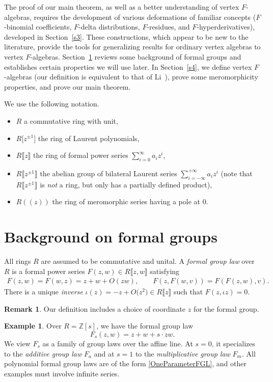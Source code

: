 \documentclass[pdftex]{sigma}
\numberwithin{equation}{section}
\theoremstyle{definition}
\newtheorem{Example}[Theorem]{Example}
\newtheorem{Remark}[Theorem]{Remark}
\def\lb{\llbracket}
\def\rb{\rrbracket}
\begin{document}
The proof of our main theorem, as well as a better understanding of vertex $F$-algebras, requires the development of various deformations of familiar concepts ($F$-binomial coefficients, $F$-delta distributions, $F$-residues, and $F$-hyperderivatives), developed in Section~\ref{s3}. These constructions, which appear to be new to the literature, provide the tools for generalizing results for ordinary vertex algebras to vertex $F$-algebras. Section~\ref{s2} reviews some background of formal groups and establishes certain properties we will use later. In Section~\ref{s4}, we define vertex $F$-algebras (our definition is equivalent to that of Li~\cite{Li}), prove some meromorphicity properties, and prove our main theorem.

We use the following notation.
\begin{itemize}\itemsep=0pt
\item
$R$ a commutative ring with unit,
\item
$R\big[z^{\pm1}\big]$ the ring of Laurent polynomials,
\item
$R\lb z\rb$ the ring of formal power series $\sum_{i=0}^\infty a_i z^i$,
\item
$R\big\lb z^{\pm1}\big\rb$ the abelian group of bilateral Laurent series $\sum_{i=-\infty}^{+\infty} a_i z^i$ (note that $R\big\lb z^{\pm1}\big\rb$ is \emph{not} a ring, but only has a partially defined product),
\item
$R(\!( z)\!)$ the ring of meromorphic series having a pole at $0$.
\end{itemize}


\section{Background on formal groups}
\label{s2}

All rings $R$ are assumed to be commutative and unital. A \emph{formal group law} over $R$ is a formal power series $F(z,w)\in R\lb z,w\rb$ satisfying
\begin{align}
 F(z,w)=F(w,z)=z+w+O(zw),
\qquad
F(z,F(w,v))=F(F(z,w),v).\label{s1eqn1}
\end{align}
There is a unique \emph{inverse} $\iota(z)=-z+O\bigl(z^2\bigr)\in R\lb z\rb$ such that $F(z,\iota z)=0$.

\begin{Remark}
Our definition includes a choice of coordinate $z$ for the formal group.
\end{Remark}

\begin{Example}
Over $R=\mathbb{Z}[s]$, we have the formal group law
\begin{equation}\label{OneParameterFGL}
 F_s(z,w)=z+w+s\cdot zw.
\end{equation}
We view $F_s$ as a family of group laws over the affine line. At $s=0$, it specializes to the \emph{additive group law} $F_a$ and at $s=1$ to the \emph{multiplicative group law} $F_m$. All polynomial formal group laws are of the form \eqref{OneParameterFGL}, and other examples must involve infinite series.
\end{Example}
\end{document}
